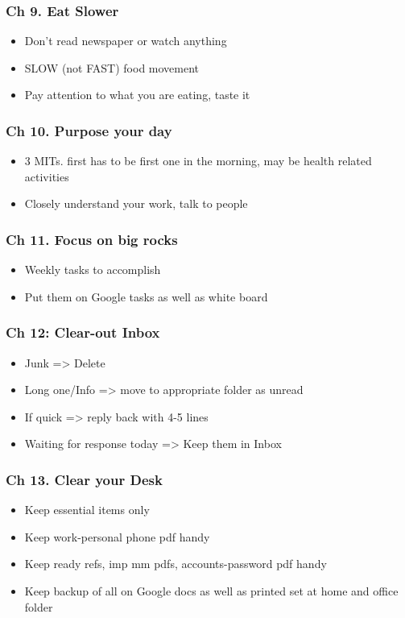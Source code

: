 \begin{frame}[fragile]
\frametitle{Ch 9. Eat Slower}
\begin{itemize}[noitemsep,nolistsep]
\item Don't read newspaper or watch anything
\item SLOW (not FAST) food movement
\item Pay attention to what you are eating, taste it
\end{itemize}
\end{frame}

\begin{frame}[fragile]
\frametitle{Ch 10. Purpose your day}
\begin{itemize}[noitemsep,nolistsep]
\item 3 MITs. first has to be first one in the morning, may be health related activities
\item Closely understand your work, talk to people
\end{itemize}
\end{frame}

\begin{frame}[fragile]
\frametitle{Ch 11. Focus on big rocks}
\begin{itemize}[noitemsep,nolistsep]
\item Weekly tasks to accomplish
\item Put them on Google tasks as well as white board
\end{itemize}
\end{frame}

\begin{frame}[fragile]
\frametitle{Ch 12: Clear-out Inbox}
\begin{itemize}[noitemsep,nolistsep]
\item Junk => Delete
\item Long one/Info => move to appropriate folder as unread
\item If quick => reply back with 4-5 lines
\item Waiting for response today => Keep them in Inbox
\end{itemize}
\end{frame}

\begin{frame}[fragile]
\frametitle{Ch 13. Clear your Desk}
\begin{itemize}[noitemsep,nolistsep]
\item Keep essential items only
\item Keep work-personal phone pdf handy
\item Keep ready refs, imp mm pdfs, accounts-password pdf handy
\item Keep backup of all on Google docs as well as printed set at home and office folder
\end{itemize}
\end{frame}

